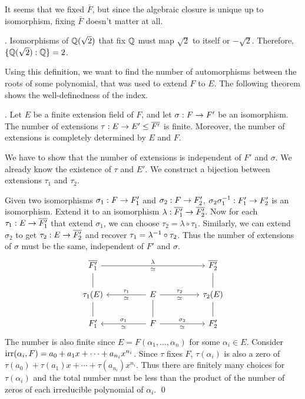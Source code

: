 It seems that we fixed \(\bar{F}\), but since the algebraic closure is unique up to isomorphism, fixing \(\bar{F}\) doesn't matter at all.

\ex. Isomorphisms of \(\mathbb{Q}(\sqrt{2})\) that fix \(\mathbb{Q}\) must map \(\sqrt{2}\) to itself or \(-\sqrt{2}\). Therefore, \(\{\mathbb{Q}(\sqrt{2}) : \mathbb{Q}\} = 2\).

Using this definition, we want to find the number of automorphisms between the roots of some polynomial, that was used to extend \(F\) to \(E\). The following theorem shows the well-definedness of the index.

\thm. Let \(E\) be a finite extension field of \(F\), and let \(\sigma : F \rightarrow F'\) be an isomorphism. The number of extensions \(\tau : E \ra E' \leq \bar{F'}\) is finite. Moreover, the number of extensions is completely determined by \(E\) and \(F\).

\pf We have to show that the number of extensions is independent of \(F'\) and \(\sigma\). We already know the existence of \(\tau\) and \(E'\). We construct a bijection between extensions \(\tau_1\) and \(\tau_2\).

Given two isomorphisms \(\sigma_1 : F \rightarrow F_1'\) and \(\sigma_2 : F \rightarrow F_2'\), \(\sigma_2 \sigma_1^{-1} : F_1' \rightarrow F_2'\) is an isomorphism. Extend it to an isomorphism \(\lambda : \bar{F_1'} \ra \bar{F_2'}\). Now for each \(\tau_1 : E \ra \bar{F_1'}\) that extend \(\sigma_1\), we can choose \(\tau_2 = \lambda \circ \tau_1\). Similarly, we can extend \(\sigma_2\) to get \(\tau_2 : E \ra \bar{F_2'}\) and recover \(\tau_1 = \lambda^{-1} \circ \tau_2\). Thus the number of extensions of \(\sigma\) must be the same, independent of \(F'\) and \(\sigma\).
\[
    \begin{tikzcd}
        \bar{F_1'} \arrow[dash]{d} \arrow{rrrr}{\lambda}[swap]{\simeq} && && \bar{F_2'} \arrow[dash]{d} \\
        \tau_1(E) \arrow[dash]{d}&& E \arrow{ll}{\simeq}[swap]{\tau_1} \arrow{rr}{\tau_2}[swap]{\simeq} \arrow[dash]{d} && \tau_2(E) \arrow[dash]{d} \\
        F_1' && F \arrow{ll}{\simeq}[swap]{\sigma_1} \arrow{rr}{\sigma_2}[swap]{\simeq} && F_2'
    \end{tikzcd}
\]
The number is also finite since \(E = F(\alpha_1, \dots, \alpha_n)\) for some \(\alpha_i \in E\). Consider \(\mathrm{irr}(\alpha_i, F) = a_0 + a_1 x + \cdots + a_{n_i} x^{n_i}\). Since \(\tau\) fixes \(F\), \(\tau(\alpha_i)\) is also a zero of \(\tau(a_0) + \tau(a_1) x + \cdots + \tau(a_{n_i}) x^{n_i}\). Thus there are finitely many choices for \(\tau(\alpha_i)\) and the total number must be less than the product of the number of zeros of each irreducible polynomial of \(\alpha_i\). \qed

\smallskip
